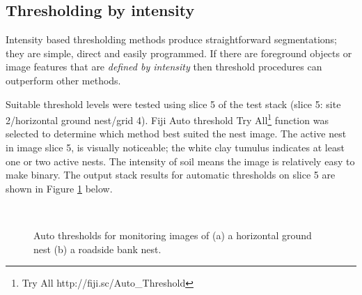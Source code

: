 \subsection{Thresholding by intensity}
Intensity based thresholding methods produce straightforward segmentations; they are simple, direct and easily programmed. If there are foreground objects or image features that are \emph{defined by intensity} then threshold procedures can outperform other methods. 

Suitable threshold levels were tested using slice 5 of the test stack (slice 5: site 2/horizontal ground nest/grid 4). Fiji Auto threshold {Try All}\footnote{Try All http://fiji.sc/Auto\_Threshold} \cite{AutoThresholdFiji} function was selected to determine which method best suited the nest image. The active nest in image slice 5, is visually noticeable; the white clay tumulus indicates at least one or two active nests. The intensity of soil means the image is relatively easy to make binary. The output stack results for automatic thresholds on slice 5 are shown in Figure \ref{fig:variability-tryall-threshold} below.

\begin{figure}[!htbp]\myfloatalign
{} \
 \
\caption[Images of active nests and thresholding tests.]{Auto thresholds for monitoring images of (a) a horizontal ground nest (b) a roadside bank nest.}\label{fig:variability-tryall-threshold}
\end{figure}

